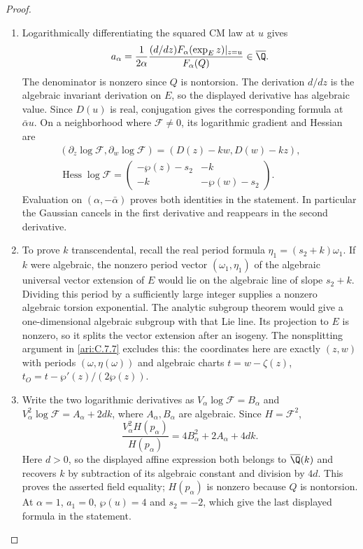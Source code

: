 \begin{proof}
\begin{enumerate}[label=\arabic*.,leftmargin=*]
\item Logarithmically differentiating the squared CM law at $u$
gives
\[
 a_\alpha=\frac{1}{2\alpha}
     \frac{(d/dz)F_\alpha(\exp_Ez)|_{z=u}}{F_\alpha(Q)}
                  \in\overline{\Q}.
\]
The denominator is nonzero since $Q$ is nontorsion. The
derivation $d/dz$ is the algebraic invariant derivation on
$E$, so the displayed derivative has algebraic value.
Since $D(u)$ is real, conjugation gives the corresponding
formula at $\bar\alpha u$. On a neighborhood where
$\mathcal F\ne0$, its logarithmic gradient and Hessian are
\label{layout:I:3}
\[
\begin{gathered}
(\partial_z\log\mathcal F,\partial_w\log\mathcal F)
       =(D(z)-kw,D(w)-kz),\qquad
 \\
\operatorname{Hess}\log\mathcal F=
 \begin{pmatrix}-\wp(z)-s_2&-k\\-k&-\wp(w)-s_2\end{pmatrix}.
\end{gathered}
\]
Evaluation on $(\alpha,-\bar\alpha)$ proves both identities
in the statement. In particular the Gaussian cancels in the
first derivative and reappears in the second derivative.

\item To prove $k$ transcendental, recall the real period formula
$\eta_1=(s_2+k)\omega_1$. If $k$ were algebraic, the
nonzero period vector $(\omega_1,\eta_1)$ of the algebraic
universal vector extension of $E$ would lie on the algebraic
line of slope $s_2+k$. Dividing this period by a sufficiently
large integer supplies a nonzero algebraic torsion exponential.
The analytic subgroup theorem
\citep[Theorem~6.1, arXiv v8, p.~43]{huber2022} would give a one-dimensional
algebraic subgroup with that Lie line. Its projection to $E$ is nonzero, so it splits the vector
extension after an isogeny. The nonsplitting argument in
\cref{ari:C.7.7} excludes this: the coordinates here are
exactly $(z,w)$ with periods $(\omega,\eta(\omega))$ and
algebraic charts $t=w-\zeta(z)$,
$t_O=t-\wp'(z)/(2\wp(z))$.

\item Write the two logarithmic derivatives as
$V_\alpha\log\mathcal F=B_\alpha$ and
$V_\alpha^2\log\mathcal F=A_\alpha+2dk$, where
$A_\alpha,B_\alpha$ are algebraic. Since $H=\mathcal F^2$,
\[
 \frac{V_\alpha^2H(p_\alpha)}{H(p_\alpha)}
       =4B_\alpha^2+2A_\alpha+4dk.
\]
Here $d>0$, so the displayed affine expression both belongs to
$\overline\Q(k)$ and recovers $k$ by subtraction of its algebraic
constant and division by $4d$. This proves the asserted field
equality; $H(p_\alpha)$ is nonzero because $Q$ is nontorsion.
At $\alpha=1$, $a_1=0$, $\wp(u)=4$ and $s_2=-2$,
which give the last displayed formula in the statement.


\end{enumerate}
\end{proof}
